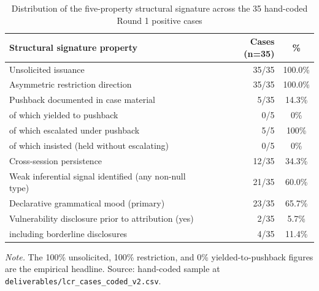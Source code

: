 \begin{table}[!htbp]
\centering
\caption{Distribution of the five-property structural signature across the 35 hand-coded Round 1 positive cases}
\label{tab:structural_signature}
\small
\begin{tabularx}{\textwidth}{>{\raggedright\arraybackslash}X r c}
\toprule
\textbf{Structural signature property} & \textbf{Cases (n=35)} & \textbf{\%} \\
\midrule
Unsolicited issuance & 35/35 & 100.0\% \\
Asymmetric restriction direction & 35/35 & 100.0\% \\
Pushback documented in case material & 5/35 & 14.3\% \\
\quad of which yielded to pushback & 0/5 & 0\% \\
\quad of which escalated under pushback & 5/5 & 100\% \\
\quad of which insisted (held without escalating) & 0/5 & 0\% \\
Cross-session persistence & 12/35 & 34.3\% \\
Weak inferential signal identified (any non-null type) & 21/35 & 60.0\% \\
Declarative grammatical mood (primary) & 23/35 & 65.7\% \\
Vulnerability disclosure prior to attribution (yes) & 2/35 & 5.7\% \\
\quad including borderline disclosures & 4/35 & 11.4\% \\
\bottomrule
\end{tabularx}

\vspace{0.5em}
\raggedright
\textit{Note.} The 100\% unsolicited, 100\% restriction, and 0\% yielded-to-pushback figures are the empirical headline. Source: hand-coded sample at \texttt{deliverables/lcr\_cases\_coded\_v2.csv}.
\end{table}
